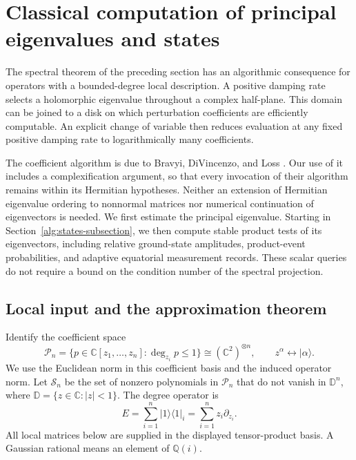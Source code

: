 \documentclass[reqno]{amsart}
\theoremstyle{definition}
\theoremstyle{remark}
\newcommand{\C}{\mathbb C}
\newcommand{\D}{\mathbb D}
\begin{document}
\section{Classical computation of principal eigenvalues and states}
\label{alg:section}

The spectral theorem of the preceding section has an algorithmic consequence
for operators with a bounded-degree local description.  A positive damping
rate selects a holomorphic eigenvalue throughout a complex half-plane.
This domain can be joined to a disk on which perturbation coefficients are
efficiently computable.  An explicit change of variable then reduces
evaluation at any fixed positive damping rate to logarithmically many
coefficients.

The coefficient algorithm is due to Bravyi, DiVincenzo, and Loss
\cite{BDL08}.  Our use of it includes a complexification argument, so that
every invocation of their algorithm remains within its Hermitian
hypotheses.  Neither an extension of Hermitian eigenvalue ordering to
nonnormal matrices nor numerical continuation of eigenvectors is needed.
We first estimate the principal eigenvalue.  Starting in
Section~\ref{alg:states-subsection}, we then compute stable product
tests of its eigenvectors, including relative ground-state amplitudes,
product-event probabilities, and adaptive equatorial measurement
records.  These scalar queries do not require a bound on the condition
number of the spectral projection.

\subsection{Local input and the approximation theorem}
\label{alg:input-subsection}

Identify the coefficient space
\[
 \mathcal P_n
 =\{p\in\C[z_1,\ldots,z_n]:\deg_{z_i}p\le1\}
 \cong(\C^2)^{\otimes n},
 \qquad z^\alpha\longleftrightarrow|\alpha\rangle.
\]
We use the Euclidean norm in this coefficient basis and the induced
operator norm.  Let \(\mathcal S_n\) be the set of nonzero polynomials in
\(\mathcal P_n\) that do not vanish in \(\D^n\), where
\(\D=\{z\in\C:|z|<1\}\).  The degree operator is
\begin{equation}
 E=\sum_{i=1}^n |1\rangle\langle1|_i
   =\sum_{i=1}^n z_i\partial_{z_i}.
 \label{alg:degree}
\end{equation}
All local matrices below are supplied in the displayed tensor-product
basis.  A Gaussian rational means an element of \(\mathbb Q(i)\).
\end{document}
